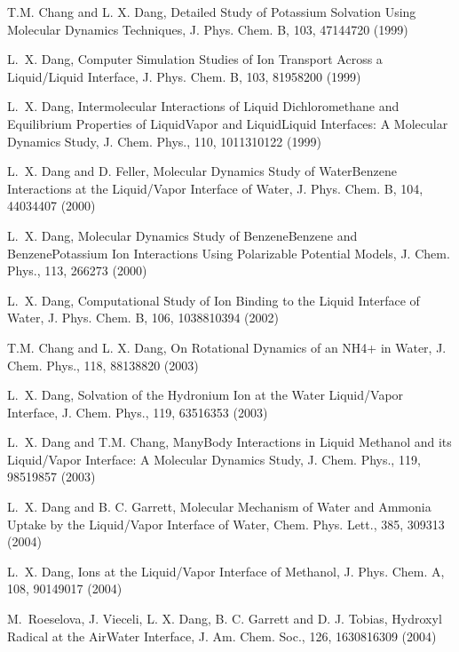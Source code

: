 \documentclass[letterpaper,11pt,english]{sphinxmanual}
\begin{document}
\sphinxAtStartPar
T.\sphinxhyphen{}M. Chang and L. X. Dang, Detailed Study of Potassium Solvation Using Molecular Dynamics Techniques, J. Phys. Chem. B, 103, 4714\sphinxhyphen{}4720 (1999)

\sphinxAtStartPar
L. X. Dang, Computer Simulation Studies of Ion Transport Across a Liquid/Liquid Interface, J. Phys. Chem. B, 103, 8195\sphinxhyphen{}8200 (1999)

\sphinxAtStartPar
L. X. Dang, Intermolecular Interactions of Liquid Dichloromethane and Equilibrium Properties of Liquid\sphinxhyphen{}Vapor and Liquid\sphinxhyphen{}Liquid Interfaces: A Molecular Dynamics Study, J. Chem. Phys., 110, 10113\sphinxhyphen{}10122 (1999)

\sphinxAtStartPar
L. X. Dang and D. Feller, Molecular Dynamics Study of Water\sphinxhyphen{}Benzene Interactions at the Liquid/Vapor Interface of Water, J. Phys. Chem. B, 104, 4403\sphinxhyphen{}4407 (2000)

\sphinxAtStartPar
L. X. Dang, Molecular Dynamics Study of Benzene\sphinxhyphen{}Benzene and Benzene\sphinxhyphen{}Potassium Ion Interactions Using Polarizable Potential Models, J. Chem. Phys., 113, 266\sphinxhyphen{}273 (2000)

\sphinxAtStartPar
L. X. Dang, Computational Study of Ion Binding to the Liquid Interface of Water, J. Phys. Chem. B, 106, 10388\sphinxhyphen{}10394 (2002)

\sphinxAtStartPar
T.\sphinxhyphen{}M. Chang and L. X. Dang, On Rotational Dynamics of an NH4+ in Water, J. Chem. Phys., 118, 8813\sphinxhyphen{}8820 (2003)

\sphinxAtStartPar
L. X. Dang, Solvation of the Hydronium Ion at the Water Liquid/Vapor Interface, J. Chem. Phys., 119, 6351\sphinxhyphen{}6353 (2003)

\sphinxAtStartPar
L. X. Dang and T.\sphinxhyphen{}M. Chang, Many\sphinxhyphen{}Body Interactions in Liquid Methanol and its Liquid/Vapor Interface: A Molecular Dynamics Study, J. Chem. Phys., 119, 9851\sphinxhyphen{}9857 (2003)

\sphinxAtStartPar
L. X. Dang and B. C. Garrett, Molecular Mechanism of Water and Ammonia Uptake by the Liquid/Vapor Interface of Water, Chem. Phys. Lett., 385, 309\sphinxhyphen{}313 (2004)

\sphinxAtStartPar
L. X. Dang, Ions at the Liquid/Vapor Interface of Methanol, J. Phys. Chem. A, 108, 9014\sphinxhyphen{}9017 (2004)

\sphinxAtStartPar
M. Roeselova, J. Vieceli, L. X. Dang, B. C. Garrett and D. J. Tobias, Hydroxyl Radical at the Air\sphinxhyphen{}Water Interface, J. Am. Chem. Soc., 126, 16308\sphinxhyphen{}16309 (2004)
\end{document}
